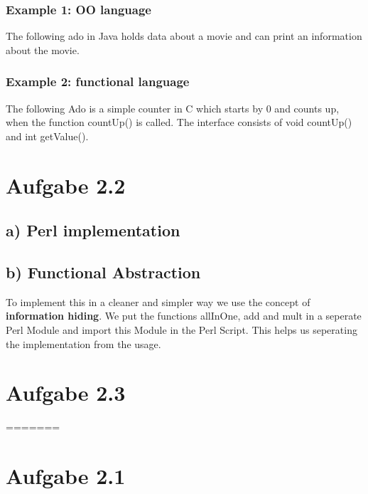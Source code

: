 \documentclass[a4paper,10pt]{scrartcl}[2003/01/01]
\begin{document}
\subsubsection*{Example 1: OO language}
The following ado in Java holds data about a movie and can print an information about the movie. 


\subsubsection*{Example 2: functional language}
The following Ado is a simple counter in C which starts by 0 and counts up, when the function countUp() is called. The interface consists of void countUp() and int getValue().



\section*{Aufgabe 2.2}
\subsection*{a) Perl implementation}


\subsection*{b) Functional Abstraction}
To implement this in a cleaner and simpler way we use the concept of \textbf{information hiding}. We put the functions allInOne, add and mult in a seperate Perl Module and import this Module in the Perl Script. This helps us seperating the implementation from the usage.





\section*{Aufgabe 2.3}


=======
	\maketitle
	
	\section*{Aufgabe 2.1}
\end{document}
